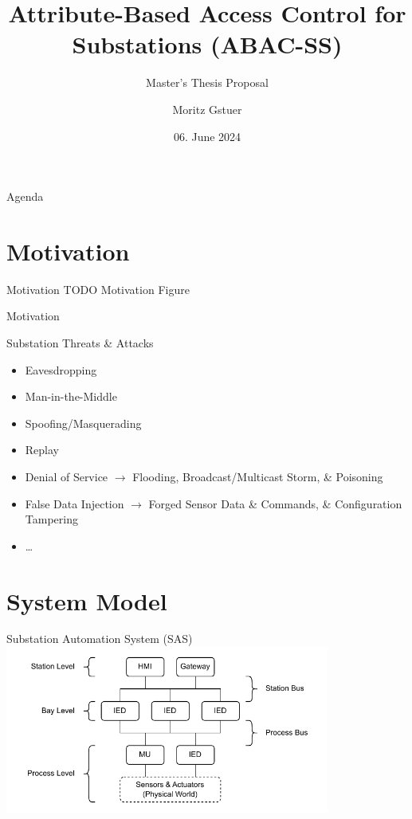 \documentclass[en]{sdqbeamer}
\title[ABAC for Substations]{Attribute-Based Access Control for Substations (ABAC-SS)}
\subtitle{Master's Thesis Proposal}
\author[Moritz Gstuer]{Moritz Gstuer}
\date[06.\,06.\,2024]{06. June 2024}
\begin{document}
 
\KITtitleframe

\begin{frame}{Agenda}
\tableofcontents
\end{frame}

\section{Motivation}
\begin{frame}{Motivation}
    TODO Motivation Figure
\end{frame}
\begin{frame}{Motivation}
    \begin{redblock}{Substation Threats \& Attacks}
        \begin{itemize}
            \item Eavesdropping
            \item Man-in-the-Middle
            \item Spoofing/Masquerading
            \item Replay
            \item Denial of Service $\rightarrow$ Flooding, Broadcast/Multicast Storm, \& Poisoning
            \item False Data Injection $\rightarrow$ Forged Sensor Data \& Commands, \& Configuration Tampering
            \item \dots
        \end{itemize}
    \end{redblock}
\end{frame}

\section{System Model}
\begin{frame}{Substation Automation System (SAS)}
    \centering
	\includegraphics[width=0.8\textwidth]{./figures/substation_architecture.drawio.pdf}
\end{frame}
\end{document}
